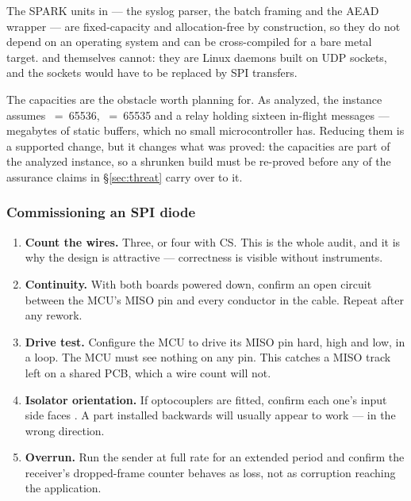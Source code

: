 \documentclass[11pt,a4paper]{article}
\renewcommand{\amp}{\prog{ld\_amp}}
\renewcommand{\deamp}{\prog{ld\_deamp}}
\begin{document}
\begin{notebox}
The SPARK units in  --- the syslog parser, the batch framing and
the AEAD wrapper --- are fixed-capacity and allocation-free by construction, so
they do not depend on an operating system and can be cross-compiled for a bare
metal target. \amp{} and \deamp{} themselves cannot: they are Linux daemons
built on UDP sockets, and the sockets would have to be replaced by SPI
transfers.

The capacities are the obstacle worth planning for. As analyzed, the instance
assumes ~=~65536, ~=~65535 and a
relay holding sixteen in-flight messages --- megabytes of static buffers, which
no small microcontroller has. Reducing them is a supported change, but it
changes what was proved: the capacities are part of the analyzed instance, so
a shrunken build must be re-proved before any of the assurance claims in
\S\ref{sec:threat} carry over to it.
\end{notebox}

\subsubsection{Commissioning an SPI diode}

\begin{enumerate}
\item \textbf{Count the wires.} Three, or four with CS. This is the whole
      audit, and it is why the design is attractive --- correctness is visible
      without instruments.
\item \textbf{Continuity.} With both boards powered down, confirm an open
      circuit between the \dstside{} MCU's MISO pin and every conductor in
      the cable. Repeat after any rework.
\item \textbf{Drive test.} Configure the \dstside{} MCU to drive its MISO pin
      hard, high and low, in a loop. The \srcside{} MCU must see nothing on
      any pin. This catches a MISO track left on a shared PCB, which a wire
      count will not.
\item \textbf{Isolator orientation.} If optocouplers are fitted, confirm each
      one's input side faces \srcside{}. A part installed backwards will
      usually appear to work --- in the wrong direction.
\item \textbf{Overrun.} Run the sender at full rate for an extended period and
      confirm the receiver's dropped-frame counter behaves as loss, not as
      corruption reaching the application.
\end{enumerate}
\end{document}
